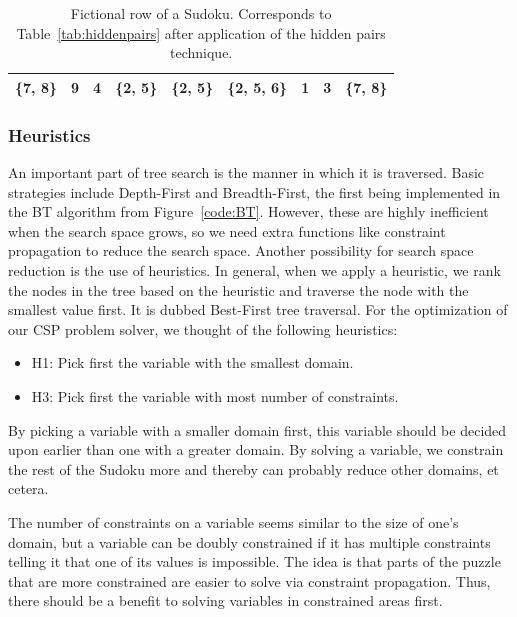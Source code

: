\documentclass[11pt]{article} %
\begin{document}
\begin{table}[htbp]
    \caption{Fictional row of a Sudoku. Corresponds to Table~\ref{tab:hiddenpairs} after application of the hidden pairs technique.}
    \label{tab:hiddenpairs_after}
    \begin{center}
        \begin{tabular}{|c|c|c|c|c|c|c|c|c|}
        \hline
        \cellcolor[gray]{0.7}\{7, 8\} & 9 & 4 & \{2, 5\} & \{2, 5\} & \{2, 5, 6\} & 1 & 3 & \cellcolor[gray]{0.7}\{7, 8\}\\
        \hline
        \end{tabular}
    \end{center}
\end{table}

\subsubsection{Heuristics}
\label{sec:heur}
An important part of tree search is the manner in which it is traversed. Basic strategies include Depth-First and Breadth-First, the first being implemented in the BT algorithm from Figure~\ref{code:BT}. However, these are highly inefficient when the search space grows, so we need extra functions like constraint propagation to reduce the search space. Another possibility for search space reduction is the use of heuristics.
In general, when we apply a heuristic, we rank the nodes in the tree based on the heuristic and traverse the node with the smallest value first. It is dubbed Best-First tree traversal. For the optimization of our CSP problem solver, we thought of the following heuristics:
\begin{itemize}
\item H1: Pick first the variable with the smallest domain.
\item H3: Pick first the variable with most number of constraints.
\end{itemize}

By picking a variable with a smaller domain first, this variable should be decided upon earlier than one with a greater domain. By solving a variable, we constrain the rest of the Sudoku more and thereby can probably reduce other domains, et cetera.

The number of constraints on a variable seems similar to the size of one's domain, but a variable can be doubly constrained if it has multiple constraints telling it that one of its values is impossible. The idea is that parts of the puzzle that are more constrained are easier to solve via constraint propagation. Thus, there should be a benefit to solving variables in constrained areas first.
\end{document}
